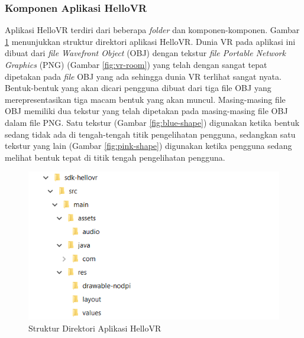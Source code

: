 \subsubsection{Komponen Aplikasi HelloVR}
Aplikasi HelloVR terdiri dari beberapa \textit{folder} dan komponen-komponen. Gambar \ref{fig:hello-vr-dir} menunjukkan struktur direktori aplikasi HelloVR. 
Dunia VR pada aplikasi ini dibuat dari {\it file Wavefront Object} (OBJ) dengan tekstur {\it file Portable Network Graphics} (PNG) (Gambar \ref{fig:vr-room}) yang telah dengan sangat tepat dipetakan pada \textit{file} OBJ yang ada sehingga dunia VR terlihat sangat nyata. Bentuk-bentuk yang akan dicari pengguna dibuat dari tiga file OBJ yang merepresentasikan tiga macam bentuk yang akan muncul. Masing-masing file OBJ memiliki dua tekstur yang telah dipetakan pada masing-masing file OBJ dalam file PNG. Satu tekstur (Gambar \ref{fig:blue-shape}) digunakan ketika bentuk sedang tidak ada di tengah-tengah titik pengelihatan pengguna, sedangkan satu tekstur yang lain (Gambar \ref{fig:pink-shape}) digunakan ketika pengguna sedang melihat bentuk tepat di titik tengah pengelihatan pengguna.

\begin{figure}[h]
	\centering
		\includegraphics[scale=1.0]{Gambar/hello_vr_dir.png}
	\caption{Struktur Direktori Aplikasi HelloVR}
	\label{fig:hello-vr-dir}
\end{figure}

